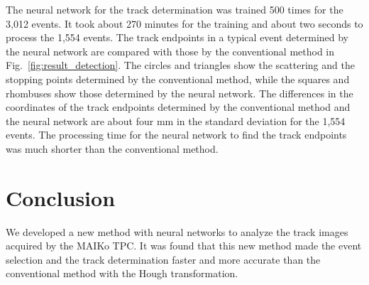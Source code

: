 \documentclass{jps-cp}
\begin{document}
The neural network for the track determination was trained 500 times for the 3,012 events.
It took about 270 minutes for the training and about two seconds to process the 1,554 events.
The track endpoints in a typical event determined by the neural network are compared with those
by the conventional method in Fig.~\ref{fig:result_detection}.
The circles and triangles show the scattering and the stopping points determined by the conventional method,
while the squares and rhombuses show those determined by the neural network.
The differences in the coordinates of the track endpoints determined by the conventional method
and the neural network are about four mm in the standard deviation for the 1,554 events.
The processing time for the neural network to find the track endpoints was much shorter than the conventional method.


\section{Conclusion}
We developed a new method with neural networks to analyze the track images acquired by the MAIKo TPC.
It was found that this new method made the event selection and the track determination faster and more accurate
than the conventional method with the Hough transformation.
\end{document}
